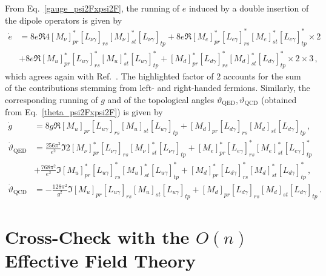From Eq.~\eqref{gauge_psi2Fxpsi2F}, the running of $e$ induced by a double insertion of the dipole operators is given by
\begin{align}
    \dot e &= 8e \Re{4[M_\nu]^*_{pr}[L_{\nu\gamma}]_{rs}[M_\nu]^*_{st}[L_{\nu\gamma}]_{tp}} + 8e \Re{[M_e]^*_{pr}[L_{e\gamma}]^*_{rs}[M_e]^*_{st}[L_{e\gamma}]^*_{tp}}\times 2 \nonumber \\
    &+ 8e \Re{[M_u]^*_{pr}[L_{u\gamma}]^*_{rs}[M_u]^*_{st}[L_{u\gamma}]^*_{tp} + [M_d]^*_{pr}[L_{d\gamma}]^*_{rs}[M_d]^*_{st}[L_{d\gamma}]^*_{tp}} \times 2 \times 3 \,,
\end{align}
which agrees again with Ref.~\cite{Jenkins:2017dyc}.
The highlighted factor of $2$ accounts for the sum of the contributions stemming from left- and right-handed fermions.
Similarly, the corresponding running of $g$ and of the topological angles $\vartheta_{\mathrm{QED}},\vartheta_{\mathrm{QCD}}$ (obtained from Eq.~\eqref{theta_psi2Fxpsi2F}) is given by
\begin{align}
    \dot g &= 8 g \Re{[M_u]_{pr}[L_{u\gamma}]_{rs}[M_u]_{st}[L_{u\gamma}]_{tp} + [M_d]_{pr}[L_{d\gamma}]_{rs}[M_d]_{st}[L_{d\gamma}]_{tp}}\,,
    \\
    \dot \vartheta_{\mathrm{QED}} &=\frac{256\pi^2}{e^2}\Im{2[M_\nu]^*_{pr}[L_{\nu\gamma}]_{rs}[M_\nu]^*_{st}[L_{\nu\gamma}]_{tp} + [M_e]^*_{pr}[L_{e\gamma}]^*_{rs}[M_e]^*_{st}[L_{e\gamma}]^*_{tp}} \nonumber \\
    &+ \frac{768\pi^2}{e^2}\Im{[M_u]^*_{pr}[L_{u\gamma}]^*_{rs}[M_u]^*_{st}[L_{u\gamma}]^*_{tp} + [M_d]^*_{pr}[L_{d\gamma}]^*_{rs}[M_d]^*_{st}[L_{d\gamma}]^*_{tp}}\,,
    \\
    \dot \vartheta_{\mathrm{QCD}} &=-\frac{128\pi^2}{g^2}\Im{[M_u]_{pr}[L_{u\gamma}]_{rs}[M_u]_{st}[L_{u\gamma}]_{tp} + [M_d]_{pr}[L_{d\gamma}]_{rs}[M_d]_{st}[L_{d\gamma}]_{tp}} \,.
\end{align}

\section{Cross-Check with the \texorpdfstring{$O(n)$}{O(n)} Effective Field Theory}
\label{sec:gEFTOn}

